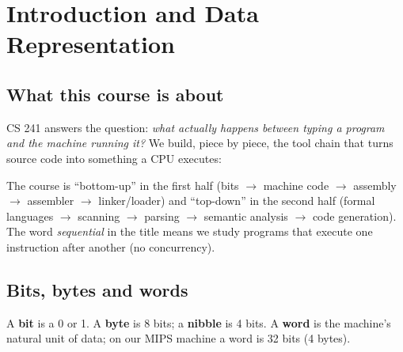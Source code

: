 \chapter{Introduction and Data Representation}

\section{What this course is about}

CS 241 answers the question: \emph{what actually happens between typing a program and the
machine running it?} We build, piece by piece, the tool chain that turns source code into
something a CPU executes:

\begin{center}
\end{center}

The course is ``bottom-up'' in the first half (bits $\to$ machine code $\to$ assembly
$\to$ assembler $\to$ linker/loader) and ``top-down'' in the second half (formal
languages $\to$ scanning $\to$ parsing $\to$ semantic analysis $\to$ code generation).
The word \emph{sequential} in the title means we study programs that execute one
instruction after another (no concurrency).

\section{Bits, bytes and words}

\begin{definition}
A \textbf{bit} is a 0 or 1. A \textbf{byte} is 8 bits; a \textbf{nibble} is 4 bits. A
\textbf{word} is the machine's natural unit of data; on our MIPS machine a word is 32 bits
(4 bytes).
\end{definition}

